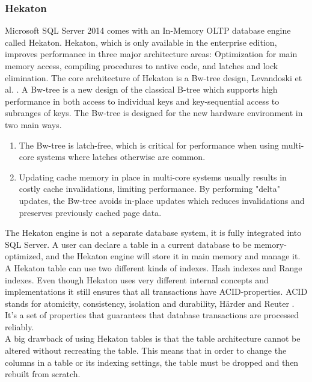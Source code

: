 \documentclass{cslthse-msc}
\begin{document}
\subsubsection{Hekaton}
Microsoft SQL Server 2014 comes with an In-Memory OLTP database engine called Hekaton. Hekaton, which is only available in the enterprise edition, improves performance in three major architecture areas: Optimization for main memory access, compiling procedures to native code, and latches and lock elimination. The core architecture of Hekaton is a Bw-tree design, Levandoski et al. \cite{Levandoski14}. A Bw-tree is a new design of the classical B-tree which supports high performance in both access to individual keys and key-sequential access to subranges of keys. The Bw-tree is designed for the new hardware environment in two main ways. 
\begin{enumerate}
\item The Bw-tree is latch-free, which is critical for performance when using multi-core systems where latches otherwise are common.
\item Updating cache memory in place in multi-core systems usually results in costly cache invalidations, limiting performance. By performing "delta" updates, the Bw-tree avoids in-place updates which reduces invalidations and preserves previously cached page data.
\end{enumerate} 
The Hekaton engine is not a separate database system, it is fully integrated into SQL Server. A user can declare a table in a current database to be memory-optimized, and the Hekaton engine will store it in main memory and manage it. A Hekaton table can use two different kinds of indexes. Hash indexes and Range indexes.  Even though Hekaton uses very different internal concepts and implementations it still ensures that all transactions have ACID-properties. ACID stands for atomicity, consistency, isolation and durability, Härder and Reuter \cite{haerder1983principles}. It's a set of properties that guarantees that database transactions are processed reliably. \\
A big drawback of using Hekaton tables is that the table architecture cannot be altered without recreating the table. This means that in order to change the columns in a table or its indexing settings, the table must be dropped and then rebuilt from scratch.
\end{document}
